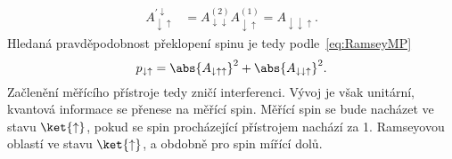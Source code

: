 \begin{solution}
\begin{enumerate}
\begin{subequations}
\begin{align}
			A_{\downarrow\uparrow}^{'\downarrow}
				&=A_{\downarrow\downarrow}^{(2)}A_{\downarrow\uparrow}^{(1)}=A_{\downarrow\downarrow\uparrow}.			
		\end{align}\end{subequations}
		Hledaná pravděpodobnost překlopení spinu je tedy podle~\eqref{eq:RamseyMP}
		\begin{equation}
			p_{\downarrow\uparrow}=\abs{A_{\downarrow\uparrow\uparrow}}^{2}+\abs{A_{\downarrow\downarrow\uparrow}}^{2}.
			\label{eq:RamseyMA}
		\end{equation}
		Začlenění měřícího přístroje tedy zničí interferenci.
		Vývoj je však unitární, kvantová informace se přenese na měřící spin.
		Měřící spin se bude nacházet ve stavu $\ket{\uparrow}$, pokud se spin procházející přístrojem nachází za 1. Ramseyovou oblastí ve stavu $\ket{\uparrow}$, a obdobně pro spin mířící dolů.


\end{enumerate}
\end{solution}
